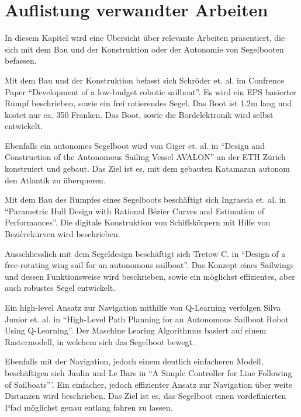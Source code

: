 \chapter{Auflistung verwandter Arbeiten}
\label{chap:literaturübersicht}

In diesem Kapitel wird eine Übersicht über relevante Arbeiten präsentiert, die sich mit dem Bau und der Konstruktion oder der Autonomie von Segelbooten befassen.

Mit dem Bau und der Konstruktion befasst sich Schröder et. al. im Confrence Paper \enquote{Development of a low-budget robotic sailboat}. Es wird ein EPS basierter Rumpf beschrieben, sowie ein frei rotierendes Segel. Das Boot ist 1.2m lang und kostet nur ca. 350 Franken. Das Boot, sowie die Bordelektronik wird selbst entwickelt. \cite{10.1007/978-3-319-02276-5_2}
 
Ebenfalls ein autonomes Segelboot wird von Giger et. al. in \enquote{Design and Construction of the Autonomous Sailing Vessel AVALON} an der ETH Zürich konstruiert und gebaut. Das Ziel ist es, mit dem gebauten Katamaran autonom den Atlantik zu überqueren. \cite{giger_design_2009}

Mit dem Bau des Rumpfes eines Segelboots beschäftigt sich Ingrassia et. al. in \enquote{Parametric Hull Design with Rational Bézier Curves and Estimation of Performances}. Die digitale Konstruktion von Schiffskörpern mit Hilfe von Bezièrekurven wird beschrieben. \cite{ingrassia_parametric_2021}

Ausschliesslich mit dem Segeldesign beschäftigt sich Tretow C. in \enquote{Design of a free-rotating wing sail for an autonomous sailboat}. Das Konzept eines Sailwings und dessen Funktionsweise wird beschrieben, sowie ein möglichst effizientes, aber auch robustes Segel entwickelt. \cite{Tretow2017DesignOA}

Ein high-level Ansatz zur Navigation mithilfe von Q-Learning verfolgen Silva Junior et. al. in \enquote{High-Level Path Planning for an Autonomous Sailboat Robot Using Q-Learning}. Der Maschine Learing Algorithmus basiert auf einem Rastermodell, in welchem sich das Segelboot bewegt. \cite{silva_junior_high-level_2020}

Ebenfalls mit der Navigation, jedoch einem deutlich einfacheren Modell, beschäftigen sich Jaulin und Le Bars in \enquote{{}A{} Simple Controller for Line Following of Sailboats}'. Ein einfacher, jedoch effizienter Ansatz zur Navigation über weite Distanzen wird beschrieben. Das Ziel ist es, das Segelboot einen vordefinierten Pfad möglichst genau entlang fahren zu lassen. \cite{sauze_simple_2013}


